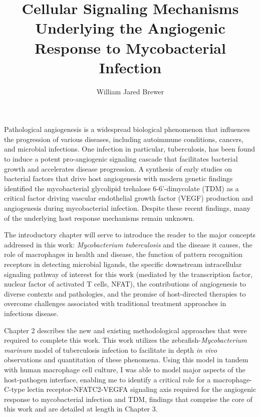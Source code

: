 \documentclass[PhD]{dukethesis2006}
\author{William Jared Brewer}
\title{Cellular Signaling Mechanisms Underlying the Angiogenic Response to Mycobacterial Infection}
\begin{document}
\maketitle{}

\makeabstract{}

\Copyright

\setlength\parindent{12pt}

\abstract

Pathological angiogenesis is a widespread biological phenomenon that influences the progression of various diseases, including autoimmune conditions, cancers, and microbial infections. One infection in particular, tuberculosis, has been found to induce a potent pro-angiogenic signaling cascade that facilitates bacterial growth and accelerates disease progression. A synthesis of early studies on bacterial factors that drive host angiogenesis with modern genetic findings identified the mycobacterial glycolipid trehalose 6-6'-dimycolate (TDM) as a critical factor driving vascular endothelial growth factor (VEGF) production and angiogenesis during mycobacterial infection. Despite these recent findings, many of the underlying host response mechanisms remain unknown. 

The introductory chapter will serve to introduce the reader to the major concepts addressed in this work: \textit{Mycobacterium tuberculosis} and the disease it causes, the role of macrophages in health and disease, the function of pattern recognition receptors in detecting microbial ligands, the specific downstream intracellular signaling pathway of interest for this work (mediated by the transcription factor, nuclear factor of activated T cells, NFAT), the contributions of angiogenesis to diverse contexts and pathologies, and the promise of host-directed therapies to overcome challenges associated with traditional treatment approaches in infectious disease. 

Chapter 2 describes the new and existing methodological approaches that were required to complete this work. This work utilizes the zebrafish-\textit{Mycobacterium marinum} model of tuberculosis infection to facilitate in depth \textit{in vivo} observations and quantitation of these phenomena. Using this model in tandem with human macrophage cell culture, I was able to model major aspects of the host-pathogen interface, enabling me to identify a critical role for a macrophage-C-type lectin receptor-NFATC2-VEGFA signaling axis required for the angiogenic response to mycobacterial infection and TDM, findings that comprise the core of this work and are detailed at length in Chapter 3. 
\end{document}
